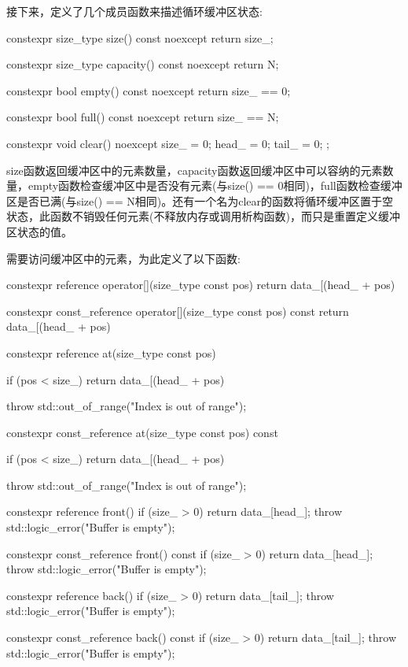 接下来，定义了几个成员函数来描述循环缓冲区状态:

\begin{cpp}
constexpr size_type size() const noexcept
{ return size_; }

constexpr size_type capacity() const noexcept
{ return N; }

constexpr bool empty() const noexcept
{ return size_ == 0; }

constexpr bool full() const noexcept
{ return size_ == N; }

constexpr void clear() noexcept
{ size_ = 0; head_ = 0; tail_ = 0; };
\end{cpp}

size函数返回缓冲区中的元素数量，capacity函数返回缓冲区中可以容纳的元素数量，empty函数检查缓冲区中是否没有元素(与size() == 0相同)，full函数检查缓冲区是否已满(与size() == N相同)。还有一个名为clear的函数将循环缓冲区置于空状态，此函数不销毁任何元素(不释放内存或调用析构函数)，而只是重置定义缓冲区状态的值。

需要访问缓冲区中的元素，为此定义了以下函数:

\begin{cpp}
constexpr reference operator[](size_type const pos)
{
	return data_[(head_ + pos) %
}

constexpr const_reference operator[](size_type const pos) const
{
	return data_[(head_ + pos) %
}

constexpr reference at(size_type const pos)
{
	if (pos < size_)
		return data_[(head_ + pos) %
		
	throw std::out_of_range("Index is out of range");
}

constexpr const_reference at(size_type const pos) const
{
	if (pos < size_)
		return data_[(head_ + pos) %
		
	throw std::out_of_range("Index is out of range");
}

constexpr reference front()
{
	if (size_ > 0) return data_[head_];
	throw std::logic_error("Buffer is empty");
}

constexpr const_reference front() const
{
	if (size_ > 0) return data_[head_];
	throw std::logic_error("Buffer is empty");
}

constexpr reference back()
{
	if (size_ > 0) return data_[tail_];
	throw std::logic_error("Buffer is empty");
}

constexpr const_reference back() const
{
	if (size_ > 0) return data_[tail_];
	throw std::logic_error("Buffer is empty");
}
\end{cpp}

